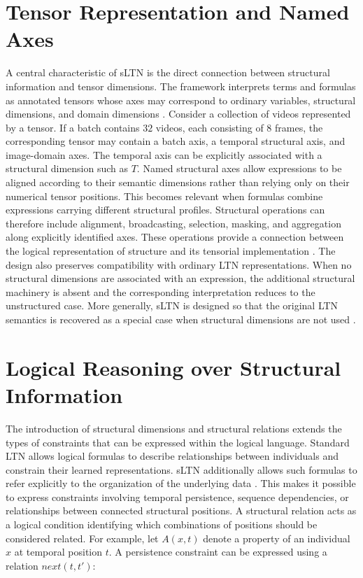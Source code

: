 \section{Tensor Representation and Named Axes}
\noindent
A central characteristic of sLTN is the direct connection between structural information and tensor dimensions. The framework interprets terms and formulas as annotated tensors whose axes may correspond to ordinary variables, structural dimensions, and domain dimensions \cite{rinaldi2026sltn}.
Consider a collection of videos represented by a tensor. If a batch contains $32$ videos, each consisting of $8$ frames, the corresponding tensor may contain a batch axis, a temporal structural axis, and image-domain axes. The temporal axis can be explicitly associated with a structural dimension such as $T$.
Named structural axes allow expressions to be aligned according to their semantic dimensions rather than relying only on their numerical tensor positions. This becomes relevant when formulas combine expressions carrying different structural profiles.
Structural operations can therefore include alignment, broadcasting, selection, masking, and aggregation along explicitly identified axes. These operations provide a connection between the logical representation of structure and its tensorial implementation \cite{rinaldi2026sltn}.
The design also preserves compatibility with ordinary LTN representations. When no structural dimensions are associated with an expression, the additional structural machinery is absent and the corresponding interpretation reduces to the unstructured case. More generally, sLTN is designed so that the original LTN semantics is recovered as a special case when structural dimensions are not used \cite{rinaldi2026sltn}.

\section{Logical Reasoning over Structural Information}
\noindent
The introduction of structural dimensions and structural relations extends the types of constraints that can be expressed within the logical language. Standard LTN allows logical formulas to describe relationships between individuals and constrain their learned representations. sLTN additionally allows such formulas to refer explicitly to the organization of the underlying data \cite{rinaldi2026sltn}.
This makes it possible to express constraints involving temporal persistence, sequence dependencies, or relationships between connected structural positions. A structural relation acts as a logical condition identifying which combinations of positions should be considered related.
For example, let $A(x,t)$ denote a property of an individual $x$ at temporal position $t$. A persistence constraint can be expressed using a relation $\mathit{next}(t,t')$:

